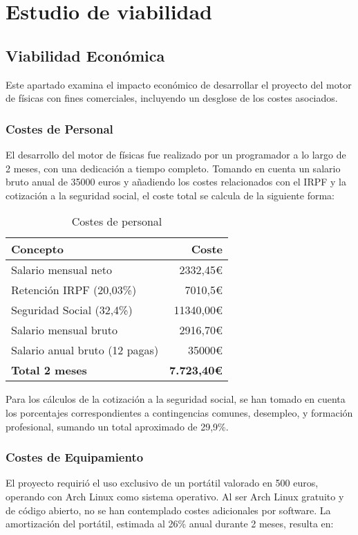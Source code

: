\section{Estudio de viabilidad}
\subsection{Viabilidad Económica}
Este apartado examina el impacto económico de desarrollar el proyecto del motor de físicas con fines comerciales, incluyendo un desglose de los costes asociados.

\subsubsection{Costes de Personal}
El desarrollo del motor de físicas fue realizado por un programador a lo largo de 2 meses, con una dedicación a tiempo completo. Tomando en cuenta un salario bruto anual de 35000 euros y añadiendo los costes relacionados con el IRPF y la cotización a la seguridad social, el coste total se calcula de la siguiente forma:

\begin{table}[h]
\centering
\begin{tabular}{| l | r |}
\hline
Concepto & Coste \\ \hline
Salario mensual neto & 2332,45€ \\
Retención IRPF (20,03\%) & 7010,5€ \\
Seguridad Social (32,4\%) & 11340,00€ \\
Salario mensual bruto & 2916,70€ \\
Salario anual bruto (12 pagas) & 35000€ \\ \hline
\textbf{Total 2 meses} & \textbf{7.723,40€} \\ \hline
\end{tabular}
\caption{Costes de personal}
\end{table}

Para los cálculos de la cotización a la seguridad social, se han tomado en cuenta los porcentajes correspondientes a contingencias comunes, desempleo, y formación profesional, sumando un total aproximado de 29,9\%\cite{seg-social}.

\subsubsection{Costes de Equipamiento}
El proyecto requirió el uso exclusivo de un portátil valorado en 500 euros, operando con Arch Linux como sistema operativo. Al ser Arch Linux gratuito y de código abierto, no se han contemplado costes adicionales por software. La amortización del portátil, estimada al 26\% anual durante 2 meses, resulta en:

